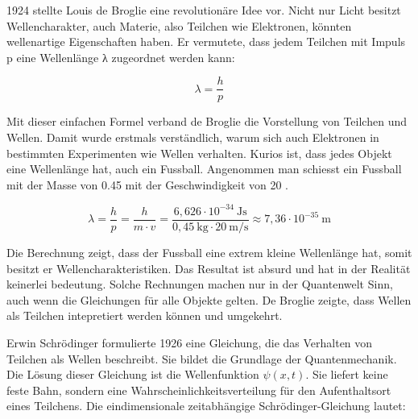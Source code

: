 	 
	
	

	
	1924 stellte Louis de Broglie eine revolutionäre Idee vor.
	Nicht nur Licht besitzt Wellencharakter, auch Materie, also Teilchen wie Elektronen, könnten wellenartige Eigenschaften haben.
	Er vermutete, dass jedem Teilchen mit Impuls p eine Wellenlänge λ zugeordnet werden kann:
	
	\begin{equation}
		\lambda = \frac{h}{p}
	\end{equation}	
	
	Mit dieser einfachen Formel verband de Broglie die Vorstellung von Teilchen und Wellen. Damit wurde erstmals verständlich, warum sich auch Elektronen in bestimmten Experimenten wie Wellen verhalten.
	Kurios ist, dass jedes Objekt eine Wellenlänge hat, auch ein Fussball.
	Angenommen man schiesst ein Fussball mit der Masse von 0.45  mit der Geschwindigkeit von 20 .
	
	\begin{equation}
		\lambda = \frac{h}{p} = \frac{h}{m \cdot v} = 	\frac{6{,}626 \cdot 10^{-34} \ \text{Js}}{0{,}45 \ \text{kg} \cdot 20 \ \text{m/s}} \approx 7{,}36 \cdot 10^{-35} \ \text{m}
	\end{equation}	
	
	Die Berechnung zeigt, dass der Fussball eine extrem kleine Wellenlänge hat, somit besitzt er Wellencharakteristiken.
	Das Resultat ist absurd und hat in der Realität keinerlei bedeutung.
	Solche Rechnungen machen nur in der Quantenwelt Sinn, auch wenn die Gleichungen für alle Objekte gelten. 
	De Broglie zeigte, dass Wellen als Teilchen intepretiert werden können und umgekehrt. 
	
	
	
	Erwin Schrödinger formulierte 1926 eine Gleichung, die das Verhalten von Teilchen als Wellen beschreibt. 
	Sie bildet die Grundlage der Quantenmechanik. Die Lösung dieser Gleichung ist die Wellenfunktion \( \psi(x, t) \). Sie liefert keine feste Bahn, sondern eine Wahrscheinlichkeitsverteilung für den Aufenthaltsort eines Teilchens.  
	Die eindimensionale zeitabhängige Schrödinger-Gleichung lautet:
	
